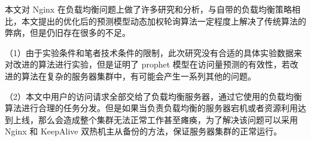 本文对 Nginx 在负载均衡问题上做了许多研究和分析，与自带的负载均衡策略相比，本文提出的优化后的预测模型动态加权轮询算法一定程度上解决了传统算法的弊病，但是仍旧存在很多的不足。

（1）由于实验条件和笔者技术条件的限制，此次研究没有合适的具体实验数据来对改进的算法进行实验，但是证明了 prophet 模型在访问量预测的有效性，若改进的算法在复杂的服务器集群中，有可能会产生一系列其他的问题。

（2）本文中用户的访问请求全部交给了负载均衡服务器，通过它使用的负载均衡算法进行合理的任务分发。但是如果当负责负载均衡的服务器宕机或者资源利用达到上线，那么会造成整个集群无法正常工作甚至瘫痪，为了解决该问题可以采用 Nginx 和 KeepAlive 双热机主从备份的方法，保证服务器集群的正常运行。
